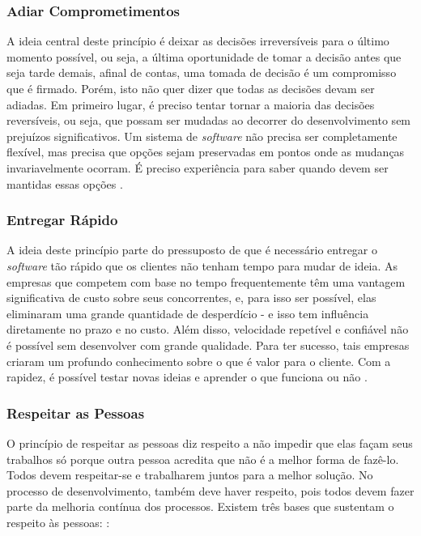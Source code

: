 \subsubsection[Adiar Comprometimentos]{Adiar Comprometimentos}

A ideia central deste princípio é deixar as decisões irreversíveis para o último momento possível, ou seja, a última oportunidade de tomar a decisão antes que seja tarde demais, afinal de contas, uma tomada de decisão é um compromisso que é firmado. Porém, isto não quer dizer que todas as decisões devam ser adiadas. Em primeiro lugar, é preciso tentar tornar a maioria das decisões reversíveis, ou seja, que possam ser mudadas ao decorrer do desenvolvimento sem prejuízos significativos. Um sistema de \textit{software} não precisa ser completamente flexível, mas precisa que opções sejam preservadas em pontos onde as mudanças invariavelmente ocorram. É preciso experiência para saber quando devem ser mantidas essas opções \cite{poppendieck}.

\subsubsection[Entregar Rápido]{Entregar Rápido}

A ideia deste princípio parte do pressuposto de que é necessário entregar o \textit{software} tão rápido que os clientes não tenham tempo para mudar de ideia.  As empresas que competem com base no tempo frequentemente têm uma vantagem significativa de custo sobre seus concorrentes, e, para isso ser possível, elas eliminaram uma grande quantidade de desperdício - e isso tem influência diretamente no prazo e no custo. Além disso, velocidade repetível e confiável não é possível sem desenvolver com grande qualidade. Para ter sucesso, tais empresas criaram um profundo conhecimento sobre o que é valor para o cliente. Com a rapidez, é possível testar novas ideias e aprender o que funciona ou não  \cite{poppendieck}. 

\subsubsection[Respeitar as Pessoas]{Respeitar as Pessoas}

O princípio de respeitar as pessoas diz respeito a não impedir que elas façam seus trabalhos só porque outra pessoa acredita que não é a melhor forma de fazê-lo. Todos devem respeitar-se e trabalharem juntos para a melhor solução. No processo de desenvolvimento, também deve haver respeito, pois todos devem fazer parte da melhoria contínua dos processos. Existem três bases que sustentam o respeito às pessoas: \cite{poppendieck}:

